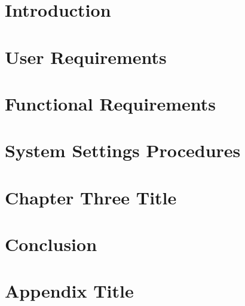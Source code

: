 \documentclass[12pt]{report}
\begin{document}
 \tableofcontents
 \chapter{Introduction}

  \chapter{User Requirements}
 
 
  \chapter{Functional Requirements}
 
 
 \chapter{System Settings Procedures}
 
 \chapter{Chapter Three Title}

 
 \chapter{Conclusion}
 
 \appendix
 \chapter{Appendix Title}
 
 
 

 
\end{document}
